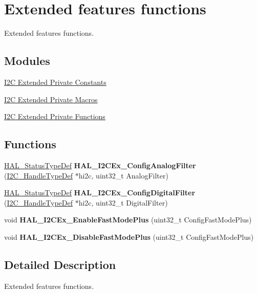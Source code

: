 \hypertarget{group___i2_c_ex___exported___functions___group1}{}\section{Extended features functions}
\label{group___i2_c_ex___exported___functions___group1}


Extended features functions.  


\subsection*{Modules}
\begin{DoxyCompactItemize}
\item 
\hyperlink{group___i2_c_ex___private___constants}{I2\+C Extended Private Constants}
\item 
\hyperlink{group___i2_c_ex___private___macro}{I2\+C Extended Private Macros}
\item 
\hyperlink{group___i2_c_ex___private___functions}{I2\+C Extended Private Functions}
\end{DoxyCompactItemize}
\subsection*{Functions}
\begin{DoxyCompactItemize}
\item 
\mbox{\label{group___i2_c_ex___exported___functions___group1_ga2f0b5fc42fca412214f3968e528e2b9e}} 
\hyperlink{stm32f0xx__hal__def_8h_a63c0679d1cb8b8c684fbb0632743478f}{H\+A\+L\+\_\+\+Status\+Type\+Def} {\bfseries H\+A\+L\+\_\+\+I2\+C\+Ex\+\_\+\+Config\+Analog\+Filter} (\hyperlink{struct_____i2_c___handle_type_def}{I2\+C\+\_\+\+Handle\+Type\+Def} $\ast$hi2c, uint32\+\_\+t Analog\+Filter)
\item 
\mbox{\label{group___i2_c_ex___exported___functions___group1_ga474acc9b92626a0f690bf9aa8991a476}} 
\hyperlink{stm32f0xx__hal__def_8h_a63c0679d1cb8b8c684fbb0632743478f}{H\+A\+L\+\_\+\+Status\+Type\+Def} {\bfseries H\+A\+L\+\_\+\+I2\+C\+Ex\+\_\+\+Config\+Digital\+Filter} (\hyperlink{struct_____i2_c___handle_type_def}{I2\+C\+\_\+\+Handle\+Type\+Def} $\ast$hi2c, uint32\+\_\+t Digital\+Filter)
\item 
\mbox{\label{group___i2_c_ex___exported___functions___group1_ga4002aa7dd388a6c1a4d6a3ff27b65942}} 
void {\bfseries H\+A\+L\+\_\+\+I2\+C\+Ex\+\_\+\+Enable\+Fast\+Mode\+Plus} (uint32\+\_\+t Config\+Fast\+Mode\+Plus)
\item 
\mbox{\label{group___i2_c_ex___exported___functions___group1_ga3ad1ae2b495e02f6c750871d283cef44}} 
void {\bfseries H\+A\+L\+\_\+\+I2\+C\+Ex\+\_\+\+Disable\+Fast\+Mode\+Plus} (uint32\+\_\+t Config\+Fast\+Mode\+Plus)
\end{DoxyCompactItemize}


\subsection{Detailed Description}
Extended features functions. 

